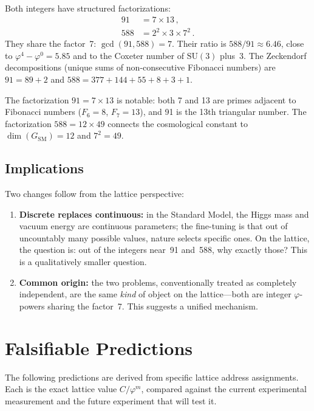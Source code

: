 \documentclass[12pt,a4paper]{article}
\newcommand{\vp}{\varphi}
\newcommand{\SM}{\mathrm{SM}}
\begin{document}
Both integers have structured factorizations:
\begin{align}
  91  &= 7 \times 13\,, \\
  588 &= 2^2 \times 3 \times 7^2\,.
\end{align}
They share the factor~7: $\gcd(91, 588) = 7$.  Their ratio is
$588/91 \approx 6.46$, close to $\vp^4 - \vp^0 = 5.85$ and to the Coxeter
number of $\mathrm{SU}(3)$ plus~3.  The Zeckendorf decompositions (unique
sums of non-consecutive Fibonacci numbers) are $91 = 89 + 2$ and
$588 = 377 + 144 + 55 + 8 + 3 + 1$.

The factorization $91 = 7 \times 13$ is notable: both 7 and 13 are primes
adjacent to Fibonacci numbers ($F_6 = 8$, $F_7 = 13$), and 91 is the 13th
triangular number.  The factorization $588 = 12 \times 49$ connects the
cosmological constant to $\dim(G_{\SM}) = 12$ and $7^2 = 49$.

\subsection{Implications}
\label{sec:implications}

Two changes follow from the lattice perspective:
\begin{enumerate}[nosep]
  \item \textbf{Discrete replaces continuous:} in the Standard Model, the
    Higgs mass and vacuum energy are continuous parameters; the fine-tuning
    is that out of uncountably many possible values, nature selects specific
    ones.  On the lattice, the question is: out of the integers near~91
    and~588, why exactly those?  This is a qualitatively smaller question.
  \item \textbf{Common origin:} the two problems, conventionally treated as
    completely independent, are the same \emph{kind} of object on the
    lattice---both are integer $\vp$-powers sharing the factor~7.  This
    suggests a unified mechanism.
\end{enumerate}


\section{Falsifiable Predictions}
\label{sec:predictions}

The following predictions are derived from specific lattice address
assignments.  Each is the exact lattice value $C/\vp^m$, compared against the
current experimental measurement and the future experiment that will test it.
\end{document}
